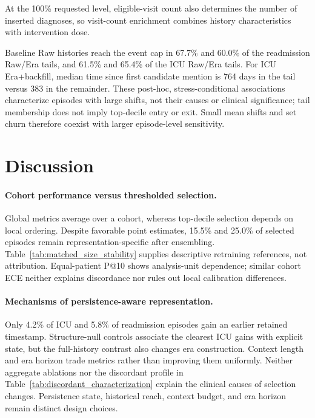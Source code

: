 \documentclass{article}
\begin{document}
At the 100\% requested level, eligible-visit count also determines the number
of inserted diagnoses, so visit-count enrichment combines history
characteristics with intervention dose.

Baseline Raw histories reach the event cap in 67.7\% and 60.0\% of the
readmission Raw/Era tails, and 61.5\% and 65.4\% of the ICU Raw/Era tails.
For ICU Era+backfill, median time since first candidate mention is 764 days
in the tail versus 383 in the remainder. These post-hoc, stress-conditional
associations characterize episodes with large shifts, not their causes or
clinical significance; tail membership does not imply top-decile entry or exit.
Small mean shifts and set churn therefore coexist with larger episode-level
sensitivity.

\FloatBarrier

\section{Discussion}

\paragraph{Cohort performance versus thresholded selection.}
Global metrics average over a cohort, whereas top-decile selection depends on
local ordering. Despite favorable point estimates, 15.5\% and 25.0\% of
selected episodes remain representation-specific after ensembling.
Table~\ref{tab:matched_size_stability} supplies descriptive retraining references,
not attribution. Equal-patient P@10 shows analysis-unit dependence; similar
cohort ECE neither explains discordance nor rules out local calibration differences.

\paragraph{Mechanisms of persistence-aware representation.}
Only 4.2\% of ICU and 5.8\% of readmission episodes gain an earlier retained
timestamp. Structure-null controls associate the clearest ICU gains with
explicit state, but the full-history contrast also changes era construction.
Context length and era horizon trade metrics rather than improving them uniformly.
Neither aggregate ablations nor the discordant profile in
Table~\ref{tab:discordant_characterization} explain the clinical causes of
selection changes. Persistence state, historical reach, context budget, and
era horizon remain distinct design choices.
\end{document}
